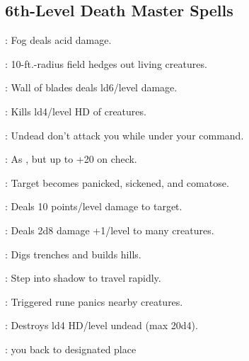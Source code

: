 \begin{multicols}{2}
\subsection{6th-Level Death Master Spells}
\begin{description*}
\item[\linkspell{Acid Fog}:] Fog deals acid damage.
\item[\linkspell{Antilife Shell}:] 10-ft.-radius field hedges out living creatures.
\item[\linkspell{Blade Barrier}:] Wall of blades deals ld6/level damage.
\item[\linkspell{Circle of Death}:] Kills ld4/level HD of creatures.
\item[\linkspell{Control Undead}:] Undead don't attack you while under your command.
\item[\linkspell{Dispel Magic, Greater}:] As , but up to +20 on check.
\item[\linkspell{Eyebite}:] Target becomes panicked, sickened, and comatose.
\item[\linkspell{Harm}:] Deals 10 points/level damage to target.
\item[\linkspell{Inflict Moderate Wounds, Mass}:] Deals 2d8 damage +1/level to many creatures.
\item[\linkspell{Move Earth}:] Digs trenches and builds hills.
\item[\linkspell{Shadow Walk}:] Step into shadow to travel rapidly.
\item[\linkspell{Symbol of Fear}:] Triggered rune panics nearby creatures.
\item[\linkspell{Undeath to Death}:] Destroys ld4 HD/level undead (max 20d4).
\item[\linkspell{Word of Recall}:]  you back to designated place
\end{description*}


\end{multicols}
